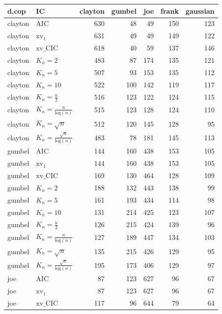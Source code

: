 \begin{table}[htbp]
\centering
\begin{tabular}{llrrrrr}
  \hline
d.cop & IC & clayton & gumbel & joe & frank & gaussian \\ 
  \hline
clayton & AIC & 630 & 48 & 49 & 150 & 123 \\ 
  clayton & $\text{xv}_{1}$ & 631 & 49 & 49 & 149 & 122 \\ 
  clayton & $\text{xv}\_\text{CIC}$ & 618 & 40 & 59 & 137 & 146 \\ 
  clayton & $K_{n}=2$ & 483 & 87 & 174 & 135 & 121 \\ 
  clayton & $K_{n}=5$ & 507 & 93 & 153 & 135 & 112 \\ 
  clayton & $K_{n}=10$ & 522 & 100 & 142 & 119 & 117 \\ 
  clayton & $K_{n}=\tfrac{n}{2}$ & 516 & 123 & 122 & 124 & 115 \\ 
  clayton & $K_{n}=\tfrac{n}{\text{log}(n)}$ & 515 & 123 & 128 & 124 & 110 \\ 
  clayton & $K_{n}=\sqrt{n}$ & 512 & 120 & 145 & 128 & 95 \\ 
  clayton & $K_{n}=\tfrac{\sqrt{n}}{\text{log}(n)}$ & 483 & 78 & 181 & 145 & 113 \\ 
   \hdashline
gumbel & AIC & 144 & 160 & 438 & 153 & 105 \\ 
  gumbel & $\text{xv}_{1}$ & 144 & 160 & 438 & 153 & 105 \\ 
  gumbel & $\text{xv}\_\text{CIC}$ & 169 & 130 & 464 & 128 & 109 \\ 
  gumbel & $K_{n}=2$ & 188 & 132 & 443 & 138 & 99 \\ 
  gumbel & $K_{n}=5$ & 161 & 193 & 434 & 114 & 98 \\ 
  gumbel & $K_{n}=10$ & 131 & 214 & 425 & 123 & 107 \\ 
  gumbel & $K_{n}=\tfrac{n}{2}$ & 126 & 215 & 424 & 139 & 96 \\ 
  gumbel & $K_{n}=\tfrac{n}{\text{log}(n)}$ & 127 & 189 & 447 & 134 & 103 \\ 
  gumbel & $K_{n}=\sqrt{n}$ & 135 & 215 & 426 & 129 & 95 \\ 
  gumbel & $K_{n}=\tfrac{\sqrt{n}}{\text{log}(n)}$ & 195 & 173 & 406 & 129 & 97 \\ 
   \hdashline
joe & AIC & 87 & 123 & 627 & 96 & 67 \\ 
  joe & $\text{xv}_{1}$ & 87 & 123 & 627 & 96 & 67 \\ 
  joe & $\text{xv}\_\text{CIC}$ & 117 & 96 & 644 & 79 & 64 \\ 

\end{tabular}
\end{table}
